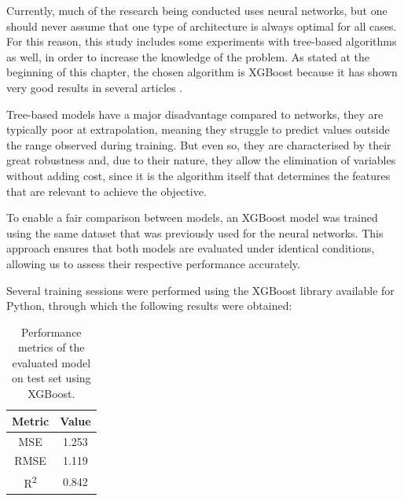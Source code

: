 Currently, much of the research being conducted uses neural networks, but one should never assume that one type of architecture is always optimal for all cases. For this reason, this study includes some experiments with tree-based algorithms as well, in order to increase the knowledge of the problem. As stated at the beginning of this chapter, the chosen algorithm is XGBoost because it has shown very good results in several articles \cite{zheng2024advancedpaymentsecuritysystemxgboost} \cite{Computer-aided-boosting}.

Tree-based models have a major disadvantage compared to networks, they are typically poor at extrapolation, meaning they struggle to predict values outside the range observed during training. But even so, they are characterised by their great robustness and, due to their nature, they allow the elimination of variables without adding cost, since it is the algorithm itself that determines the features that are relevant to achieve the objective.

To enable a fair comparison between models, an XGBoost model was trained using the same dataset that was previously used for the neural networks. This approach ensures that both models are evaluated under identical conditions, allowing us to assess their respective performance accurately.

Several training sessions were performed using the XGBoost library available for Python, through which the following results were obtained:

\begin{table}[H]
    \centering
    \begin{tabular}{|c|c|}
    \hline
    \textbf{Metric} & \textbf{Value} \\
    \hline
    MSE & 1.253 \\
    RMSE & 1.119 \\
    R\textsuperscript{2} & 0.842 \\
    \hline
    \end{tabular}
    \caption{Performance metrics of the evaluated model on test set using XGBoost.}
    \label{tab:model_performance_xgboost}
\end{table}

